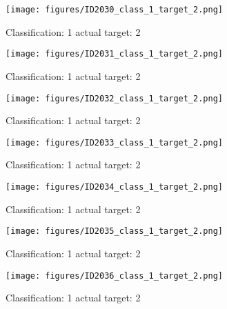 \begin{figure}[h!]
\begin{center}
\texttt{[image: figures/ID2030\_class\_1\_target\_2.png]}
\end{center}
\caption{ Classification: 1 actual target: 2}
\label{fig:ID2030_class_1_target_2}
\end{figure}
\begin{figure}[h!]
\begin{center}
\texttt{[image: figures/ID2031\_class\_1\_target\_2.png]}
\end{center}
\caption{ Classification: 1 actual target: 2}
\label{fig:ID2031_class_1_target_2}
\end{figure}
\begin{figure}[h!]
\begin{center}
\texttt{[image: figures/ID2032\_class\_1\_target\_2.png]}
\end{center}
\caption{ Classification: 1 actual target: 2}
\label{fig:ID2032_class_1_target_2}
\end{figure}
\begin{figure}[h!]
\begin{center}
\texttt{[image: figures/ID2033\_class\_1\_target\_2.png]}
\end{center}
\caption{ Classification: 1 actual target: 2}
\label{fig:ID2033_class_1_target_2}
\end{figure}
\begin{figure}[h!]
\begin{center}
\texttt{[image: figures/ID2034\_class\_1\_target\_2.png]}
\end{center}
\caption{ Classification: 1 actual target: 2}
\label{fig:ID2034_class_1_target_2}
\end{figure}
\begin{figure}[h!]
\begin{center}
\texttt{[image: figures/ID2035\_class\_1\_target\_2.png]}
\end{center}
\caption{ Classification: 1 actual target: 2}
\label{fig:ID2035_class_1_target_2}
\end{figure}
\begin{figure}[h!]
\begin{center}
\texttt{[image: figures/ID2036\_class\_1\_target\_2.png]}
\end{center}
\caption{ Classification: 1 actual target: 2}
\label{fig:ID2036_class_1_target_2}
\end{figure}
